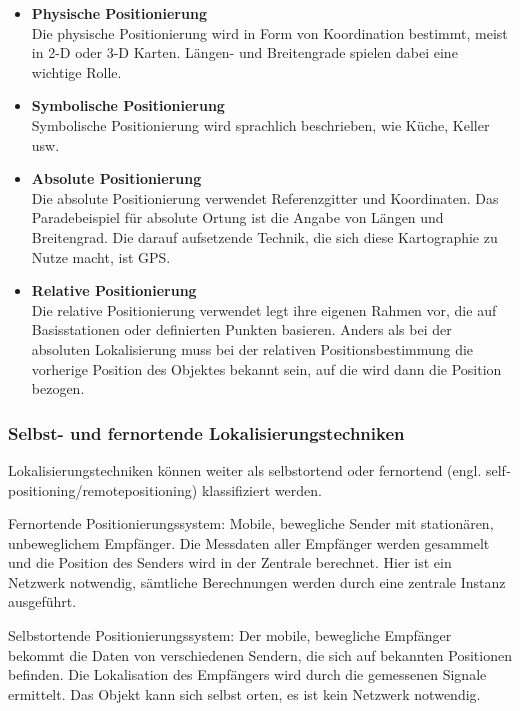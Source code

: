 \begin{itemize}
      \begin{itemize}
        \item \textbf{Physische Positionierung}\\
        Die physische Positionierung wird in Form von Koordination bestimmt, meist in 2-D oder 3-D Karten. Längen- und Breitengrade spielen dabei eine wichtige Rolle.
        \item \textbf{Symbolische Positionierung}\\
        Symbolische Positionierung wird sprachlich beschrieben, wie \zB Küche, Keller usw.
        \item \textbf{Absolute Positionierung}\\
        Die absolute Positionierung verwendet Referenzgitter und Koordinaten. Das Paradebeispiel für absolute Ortung ist die Angabe von Längen­ und Breitengrad.
        Die darauf aufsetzende Technik, die sich diese Kartographie zu Nutze macht, ist GPS.
        \item \textbf{Relative Positionierung}\\
        Die relative Positionierung verwendet legt ihre eigenen Rahmen vor, die auf Basisstationen oder definierten Punkten basieren.
        Anders als bei der absoluten Lokalisierung muss bei der relativen Positionsbestimmung die vorherige Position des Objektes bekannt sein, auf die wird dann die Position bezogen.
      \end{itemize}


    \subsubsection{Selbst- und fernortende Lokalisierungstechniken}

    Lokalisierungstechniken können weiter als selbstortend oder fernortend (engl. self­positioning/remote­positioning) klassifiziert werden.

    Fernortende Positionierungssystem: Mobile, bewegliche Sender mit stationären, unbeweglichem Empfänger. Die Messdaten aller Empfänger werden gesammelt und die
    Position des Senders wird in der Zentrale berechnet. Hier ist ein Netzwerk notwendig, sämtliche Berechnungen werden durch eine zentrale Instanz ausgeführt.

    Selbstortende Positionierungssystem: Der mobile, bewegliche Empfänger bekommt die Daten von verschiedenen Sendern, die sich auf bekannten Positionen befinden.
    Die Lokalisation des Empfängers wird durch die gemessenen Signale ermittelt. Das Objekt kann sich selbst orten, es ist kein Netzwerk notwendig.




\end{itemize}

